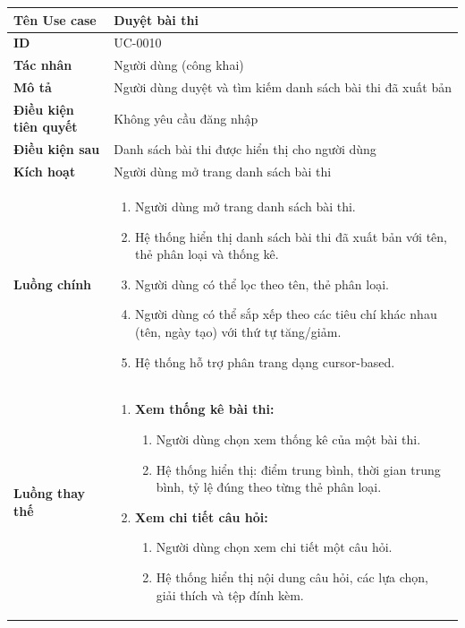 {
\small
\renewcommand{\arraystretch}{1.15}

\begin{tabularx}{\textwidth}{|>{\raggedright\arraybackslash}p{3.5cm}|>{\raggedright\arraybackslash}X|}
\hline
\textbf{Tên Use case} & Duyệt bài thi \\
\hline
\textbf{ID} & UC-0010 \\
\hline
\textbf{Tác nhân} & Người dùng (công khai) \\
\hline
\textbf{Mô tả} & Người dùng duyệt và tìm kiếm danh sách bài thi đã xuất bản \\
\hline
\textbf{Điều kiện tiên quyết} & Không yêu cầu đăng nhập \\
\hline
\textbf{Điều kiện sau} & Danh sách bài thi được hiển thị cho người dùng \\
\hline
\textbf{Kích hoạt} & Người dùng mở trang danh sách bài thi \\
\hline
\textbf{Luồng chính} &
\begin{enumerate}
    \item Người dùng mở trang danh sách bài thi.
    \item Hệ thống hiển thị danh sách bài thi đã xuất bản với tên, thẻ phân loại và thống kê.
    \item Người dùng có thể lọc theo tên, thẻ phân loại.
    \item Người dùng có thể sắp xếp theo các tiêu chí khác nhau (tên, ngày tạo) với thứ tự tăng/giảm.
    \item Hệ thống hỗ trợ phân trang dạng cursor-based.
\end{enumerate} \\
\hline
\textbf{Luồng thay thế} &
\begin{enumerate}
    \item \textbf{Xem thống kê bài thi:}
    \begin{enumerate}
        \item[3A.] Người dùng chọn xem thống kê của một bài thi.
        \item[4A.] Hệ thống hiển thị: điểm trung bình, thời gian trung bình, tỷ lệ đúng theo từng thẻ phân loại.
    \end{enumerate}
    \item \textbf{Xem chi tiết câu hỏi:}
    \begin{enumerate}
        \item[3B.] Người dùng chọn xem chi tiết một câu hỏi.
        \item[4B.] Hệ thống hiển thị nội dung câu hỏi, các lựa chọn, giải thích và tệp đính kèm.

\end{enumerate}
\end{enumerate}
\end{tabularx}}
